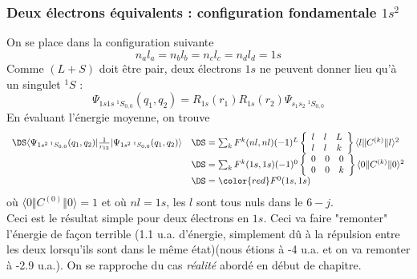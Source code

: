 \subsubsection{Deux électrons équivalents : configuration fondamentale $1s^2$}
On se place dans la configuration suivante
\begin{equation}
n_a l_a = n_b l_b = n_c l_c = n_d l_d = 1s
\end{equation}
Comme $(L+S)$ doit être pair, deux électrons $1s$ ne peuvent donner lieu qu'à un singulet $^1S$ :
\begin{equation}
\Psi _{1s 1s \; ^1S_{0,0} }(q_1,q_2)  
 = R_{1s}(r_1) R_{1s}(r_2) 
 \Psi_{s_1 s_2 \;  ^1S_{0,0} }
\end{equation}
En évaluant l'énergie moyenne, on trouve
\begin{equation}
\begin{array}{ll}
\DS \langle \Psi_{1s^2 \; ^1S_{0,0}  }(q_1,q_2) 
\vert \frac{1}{r_{12}} \vert \Psi_{1s^2 \; ^1S_{0,0}  } 
(q_1,q_2) \rangle &\DS =  \sum_k F^k (nl, nl) (-1)^{ L } \left\{ \begin{array}{ccc} l & l & L \\ l & l & k \end{array} \right\}
\langle l \Vert C^{(k)} \Vert l \rangle ^2\\
&\DS =  \sum_k F^k (1s,1s) (-1)^{ 0 } 
\left\{ \begin{array}{ccc} 0 & 0 & 0 \\ 0 & 0 & k \end{array} \right\}
\langle 0 \Vert C^{(k)} \Vert 0 \rangle ^2\\
&\DS =   {\color{red} F^0 (1s,1s)   }
\end{array}
\end{equation}
où $\langle 0 \Vert C^{(0)} \Vert 0 \rangle = 1$ et où $nl=1s$, les $l$ sont tous nuls dans le 
$6-j$.\\

Ceci est le résultat simple pour deux électrons en $1s$. Ceci va faire "remonter" l'énergie de façon
terrible (1.1 u.a. d'énergie, simplement dû à la répulsion entre les deux lorsqu'ils sont dans le même
état)(nous étions à -4 u.a. et on va remonter à -2.9 u.a.). On se rapproche du cas \textit{réalité}
abordé en début de chapitre.

